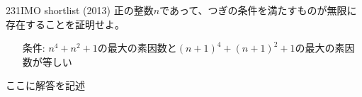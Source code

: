 \begin{thm}{231}{}{IMO shortlist (2013)}
 正の整数$n$であって、つぎの条件を満たすものが無限に存在することを証明せよ。
 \begin{itemize}
  \item[条件:] $n^4+n^2+1$の最大の素因数と$(n+1)^4+(n+1)^2+1$の最大の素因数が等しい 
 \end{itemize}
\end{thm}

ここに解答を記述